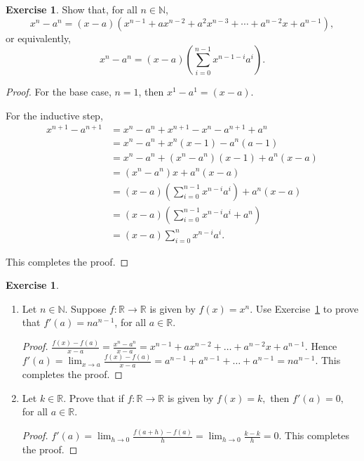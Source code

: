 \documentclass[11pt]{article}
\newcommand{\bbN}{\mathbb{N}}
\newcommand{\bbR}{\mathbb{R}}
\renewcommand{\_}[1]{\underline{ #1 }}
\theoremstyle{definition}
\newtheorem{exercise}[theorem]{Exercise}
\numberwithin{equation}{subsection}
\begin{document}
\begin{exercise}\label{powerruleex}
	Show that, for all $n\in\bbN$, 
	\[
		x^n - a^n = (x - a)(x^{n-1} + a x^{n-2} + a^2 x^{n-3} + \dotsb + a^{n-2} x + a^{n-1}),
	\]
	or equivalently,
	\[
		x^n - a^n = (x-a)\left(\sum_{i=0}^{n-1} x^{n-1-i} a^i\right).
	\]
    
\begin{proof}
For the base case, $n=1$, then $x^1-a^1=(x-a)$. 

For the inductive step, 
\begin{align*}
x^{n+1} - a^{n+1} &= x^{n} - a^{n} + x^{n+1} - x^{n} - a^{n+1} + a^{n} \\
&= x^{n} - a^{n} + x^{n}(x - 1) - a^{n}(a - 1) \\
&= x^{n} - a^{n} + (x^{n} - a^{n})(x - 1) + a^{n}(x - a) \\
&= (x^{n} - a^{n})x + a^{n}(x - a) \\
&= (x - a)\left( \sum_{i=0}^{n-1} x^{n-i}a^{i} \right) + a^{n}(x - a) \\
&= (x - a)\left( \sum_{i=0}^{n-1} x^{n-i}a^{i} + a^{n} \right) \\
&= (x - a) \sum_{i=0}^{n} x^{n-i}a^{i}.
\end{align*}

This completes the proof.

\renewcommand\qedsymbol{QED}
\end{proof}


\end{exercise}

\begin{exercise}
\begin{enumerate}
\item[a)]Let $n\in \bbN.$ Suppose $f:\bbR\to\bbR$ is given by $f(x)=x^n.$ Use Exercise~\ref{powerruleex} to prove that $f'(a)=na^{n-1}$, for all $a\in \bbR.$

\begin{proof}
$\frac{f(x)-f(a)}{x-a}=\frac{x^n-a^n}{x-a}=x^{n-1}+ax^{n-2}+\dots+a^{n-2}x+a^{n-1}.$ Hence $f'(a)=\lim_{x \to a} \frac{f(x)-f(a)}{x-a} = a^{n-1} + a^{n-1}+\dots+a^{n-1} = na^{n-1}$. This completes the proof.



\renewcommand\qedsymbol{QED}
\end{proof}


\item[b)] Let $k\in\bbR.$ Prove that if $f:\bbR\to\bbR$ is given by $f(x)=k,$ then $f'(a)=0,$ for all $a\in \bbR.$ 

\begin{proof}
$f'(a)=\lim_{h \to 0} \frac{f(a+h)-f(a)}{h} = \lim_{h \to 0} \frac{k-k}{h} = 0$. This completes the proof.



\renewcommand\qedsymbol{QED}
\end{proof}


\end{enumerate}
\end{exercise}
\end{document}
